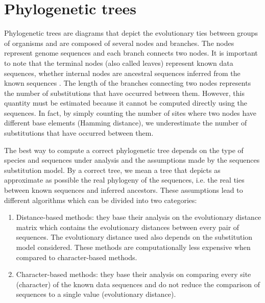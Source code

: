 \section{Phylogenetic trees} \label{phyloTree}

Phylogenetic trees are diagrams that depict the evolutionary ties between groups of organisms \cite{M10} and are composed of several nodes and branches. The nodes represent genome sequences and each branch connects two nodes. It is important to note that the terminal nodes (also called leaves) represent known data sequences, whether internal nodes are ancestral sequences inferred from the known sequences \cite{Z06, Felsenstein2003}. The length of the branches connecting two nodes represents the number of substitutions that have occurred between them. However, this quantity must be estimated because it cannot be computed directly using the sequences. In fact, by simply counting the number of sites where two nodes have different base elements (Hamming distance), we underestimate the number of substitutions that have occurred between them. 

The best way to compute a correct phylogenetic tree depends on the type of species and sequences under analysis and the assumptions made by the sequences substitution model. By a correct tree, we mean a tree that depicts as approximate as possible the real phylogeny of the sequences, i.e. the real ties between known sequences and inferred ancestors. These assumptions lead to different algorithms which can be divided into two categories:

\begin{enumerate}
    \item Distance-based methods: they base their analysis on the evolutionary distance matrix which contains the evolutionary distances between every pair of sequences. The evolutionary distance used also depends on the substitution model considered. These methods are computationally less expensive when compared to character-based methods.
    \item Character-based methods: they base their analysis on comparing every site (character) of the known data sequences and do not reduce the comparison of sequences to a single value (evolutionary distance). 
\end{enumerate}

